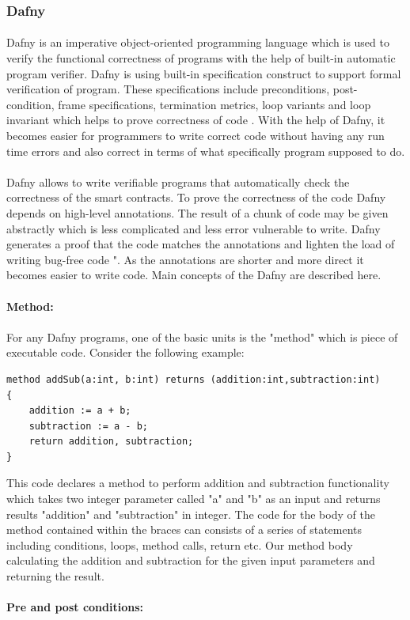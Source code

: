 \documentclass[11pt]{article}
\begin{document}
\subsubsection{Dafny}
\paragraph{}
Dafny is an imperative object-oriented programming language which is used to verify the functional correctness of programs with the help of built-in automatic program verifier. Dafny is using built-in specification construct to support formal verification of program. These specifications include preconditions, post-condition, frame specifications, termination metrics, loop variants and loop invariant which helps to prove correctness of code \cite{DafnyALa66:online}. With the help of Dafny, it becomes easier for programmers to write correct code without having any run time errors and also correct in terms of what specifically program supposed to do. 
\paragraph{}
Dafny allows to write verifiable programs that automatically check the correctness of the smart contracts. To prove the correctness of the code Dafny depends on high-level annotations. The result of a chunk of code may be given abstractly which is less complicated and less error vulnerable to write. Dafny generates a proof that the code matches the annotations and lighten the load of writing bug-free code \cite{rise4fun9:online}". As the annotations are shorter and more direct it becomes easier to write code. Main concepts of the Dafny are described here.\\ \\
\textbf{Method: }
\paragraph{}
For any Dafny programs, one of the basic units is the "method" which is piece of executable code. Consider the following example: \\
\begin{lstlisting}
method addSub(a:int, b:int) returns (addition:int,subtraction:int)
{
    addition := a + b;
    subtraction := a - b;
    return addition, subtraction;
}
\end{lstlisting}
This code declares a method to perform addition and subtraction functionality which takes two integer parameter called "a" and "b" as an input and returns results "addition" and "subtraction" in integer. The code for the body of the method contained within the braces can consists of a series of statements including conditions, loops, method calls, return etc. Our method body calculating the addition and subtraction for the given input parameters and returning the result.
\\ \\
\textbf{Pre and post conditions: }
\end{document}
